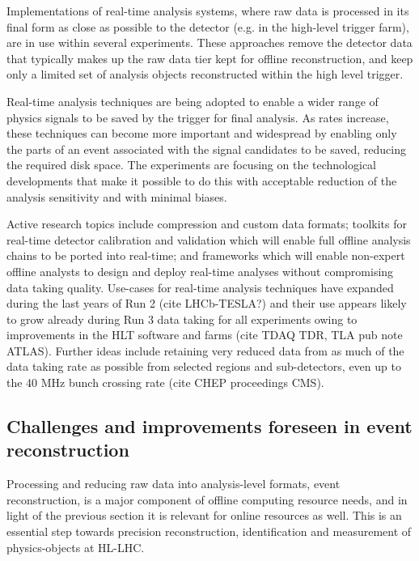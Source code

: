 \documentclass[10pt,a4paper]{article}
\begin{document}
Implementations of real-time analysis systems, where raw data is
processed in its final form as close as possible to the detector (e.g.
in the high-level trigger farm), are in use within several experiments.
These approaches remove the detector data that typically makes up the
raw data tier kept for offline reconstruction, and keep only a limited
set of analysis objects reconstructed within the high level trigger.

Real-time analysis techniques are being adopted to enable a wider range
of physics signals to be saved by the trigger for final analysis. As
rates increase, these techniques can become more important and
widespread by enabling only the parts of an event associated with the
signal candidates to be saved, reducing the required disk space. The
experiments are focusing on the technological developments that make it
possible to do this with acceptable reduction of the analysis
sensitivity and with minimal biases.

Active research topics include compression and custom data formats;
toolkits for real-time detector calibration and validation which will
enable full offline analysis chains to be ported into real-time; and
frameworks which will enable non-expert offline analysts to design and
deploy real-time analyses without compromising data taking quality.
Use-cases for real-time analysis techniques have expanded during the
last years of Run 2 (cite LHCb-TESLA?) and their use appears likely to
grow already during Run 3 data taking for all experiments owing to
improvements in the HLT software and farms (cite TDAQ TDR, TLA pub note
ATLAS). Further ideas include retaining very reduced data from as much
of the data taking rate as possible from selected regions and
sub-detectors, even up to the 40 MHz bunch crossing rate (cite CHEP
proceedings CMS).

\hypertarget{challenges-and-improvements-foreseen-in-event-reconstruction}{%
\subsection{Challenges and improvements foreseen in event
reconstruction}\label{challenges-and-improvements-foreseen-in-event-reconstruction}}

Processing and reducing raw data into analysis-level formats, event
reconstruction, is a major component of offline computing resource
needs, and in light of the previous section it is relevant for online
resources as well. This is an essential step towards precision
reconstruction, identification and measurement of physics-objects at
HL-LHC.
\end{document}
